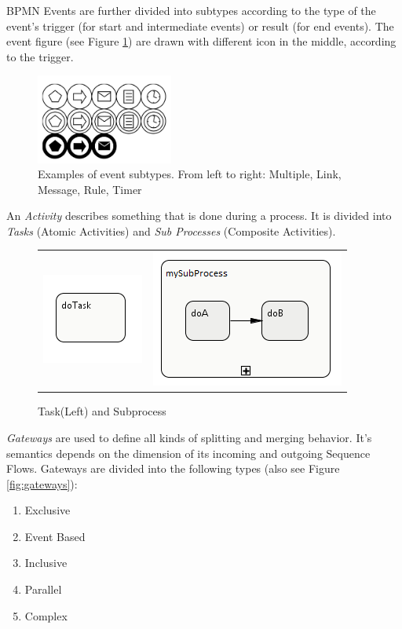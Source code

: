 BPMN Events are further divided into subtypes according to the type of the event's trigger (for start and intermediate events) or result (for end events). The event figure (see Figure \ref{fig:event_subtypes}) are drawn with different icon in the middle, according to the trigger.
\begin{figure}[htbp]
	\centering
	\includegraphics[width=0.4\textwidth]{images/event_types.png}
	\caption{Examples of event subtypes. From left to right: Multiple, Link, Message, Rule, Timer}
	\label{fig:event_subtypes}
\end{figure}

 
An \textit{Activity} describes something that is done during a process. It is divided into \textit{Tasks} (Atomic Activities) and \textit{Sub Processes} (Composite Activities).\\
\begin{figure}[h]
\centering
\begin{tabular}{cc}
\includegraphics{images/mapping/task.png} & \includegraphics{images/mapping/subprocess.png}
\end{tabular}
\caption{Task(Left) and Subprocess}%
\label{fig:task+subprocess}%
\end{figure}

\textit{Gateways} are used to define all kinds of splitting and merging behavior. It's semantics depends on the dimension of its incoming and outgoing Sequence Flows. Gateways are divided into the following types (also see Figure \ref{fig:gateways}):\\
\begin{enumerate}
	\item Exclusive
	\item Event Based
	\item Inclusive
	\item Parallel
	\item Complex
\end{enumerate}



